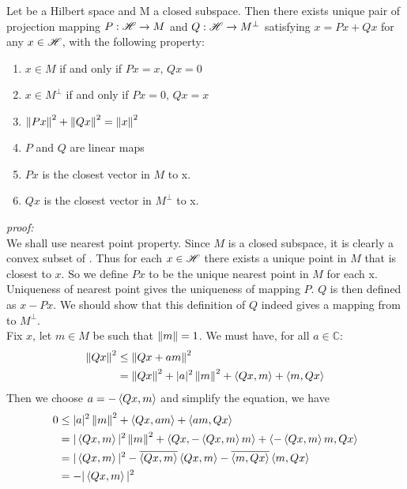 \begin{proposition}\rm\nextline
	Let \hbs be a Hilbert space and M a closed subspace. Then there exists unique pair of projection mapping $P:\mathscr{H}\xrightarrow{}M$ and $Q:\mathscr{H}\xrightarrow{}M^\perp$ satisfying $x=Px+Qx$ for any $x\in\mathscr{H}$, with the following property:
	\begin{enumerate}[(1)]
		\item $x\in M$ if and only if $Px=x,\,Qx=0$
		\item $x\in M^\perp$ if and only if $Px=0,\,Qx=x$
		\item $\left\|{Px}\right\|^2+\left\|{Qx}\right\|^2=\left\|{x}\right\|^2$
		\item $P$ and $Q$ are linear maps
		\item $Px$ is the closest vector in $M$ to x.
		\item $Qx$ is the closest vector in $M^\perp$ to x.
	\end{enumerate}
	\textit{proof:}\\
	We shall use nearest point property. Since $M$ is a closed subspace, it is clearly a convex subset of \hbs. Thus for each $x\in \mathscr{H}$ there exists a unique point in $M$ that is closest to $x$. So we define $Px$ to be the unique nearest point in $M$ for each x. Uniqueness of nearest point gives the uniqueness of mapping $P$. $Q$ is then defined as $x-Px$. We should show that this definition of $Q$ indeed gives a mapping from \hbs to $M^\perp$.\\
	Fix $x$, let $m\in M$ be such that $\left\|{m}\right\|=1$. We must have, for all $a\in\mathbb{C}$:
	\begin{equation}
		\begin{split}
			\left\|{Qx}\right\|^2&\leq\left\|{Qx+am}\right\|^2\\
			&=\left\|{Qx}\right\|^2+|a|^2\left\|{m}\right\|^2+\left<{Qx},{m}\right>+\left<{m},{Qx}\right>
		\end{split}
	\end{equation}
	Then we choose $a=-\left<{Qx},{m}\right>$ and simplify the equation, we have
	\begin{equation}
		\begin{split}
			0&\leq|a|^2\left\|{m}\right\|^2+\left<{Qx},{am}\right>+\left<{am},{Qx}\right>\\
			&=|\left<{Qx},{m}\right>|^2\left\|{m}\right\|^2+\left<{Qx},{-\left<{Qx},{m}\right>m}\right>+\left<{-\left<{Qx},{m}\right>m},{Qx}\right>\\
			&=|\left<{Qx},{m}\right>|^2-
			\overline{\left<{Qx},{m}\right>}\left<{Qx},{m}\right>-
			\overline{\left<{m},{Qx}\right>}\left<{m},{Qx}\right>\\
			&=-|\left<{Qx},{m}\right>|^2
		\end{split}
	\end{equation}

\end{proposition}
